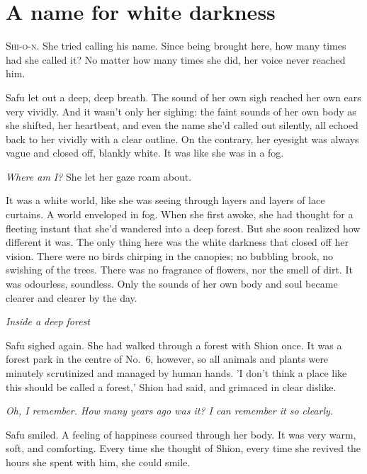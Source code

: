 
\chapter{A name for white darkness}


\lettrine{S}{hi-o-n}. She tried calling his name. Since being brought here, how many
times had she called it? No matter how many times she did, her voice
never reached him.

Safu let out a deep, deep breath. The sound of her own sigh reached her
own ears very vividly. And it wasn't only her sighing: the faint sounds
of her own body as she shifted, her heartbeat, and even the name she'd
called out silently, all echoed back to her vividly with a clear
outline. On the contrary, her eyesight was always vague and closed off,
blankly white. It was like she was in a fog.

\emph{Where am I?} She let her gaze roam about.

It was a white world, like she was seeing through layers and layers of
lace curtains. A world enveloped in fog. When she first awoke, she had
thought for a fleeting instant that she'd wandered into a deep forest.
But she soon realized how different it was. The only thing here was the
white darkness that closed off her vision. There were no birds chirping
in the canopies; no bubbling brook, no swishing of the trees. There was
no fragrance of flowers, nor the smell of dirt. It was odourless,
soundless. Only the sounds of her own body and soul became clearer and
clearer by the day.

\emph{Inside a deep forest\el }

Safu sighed again. She had walked through a forest with Shion once. It
was a forest park in the centre of No.~6, however, so all animals and
plants were minutely scrutinized and managed by human hands. 'I don't
think a place like this should be called a forest,' Shion had said, and
grimaced in clear dislike.

\emph{Oh, I remember. How many years ago was it? I can remember it so clearly.}

Safu smiled. A feeling of happiness coursed through her body. It was
very warm, soft, and comforting. Every time she thought of Shion, every
time she revived the hours she spent with him, she could smile.

